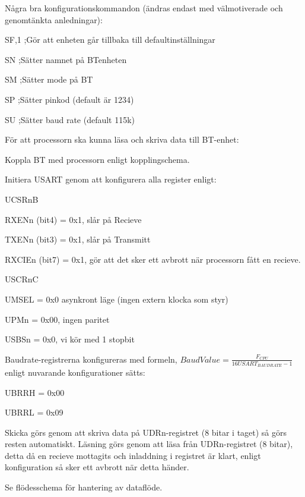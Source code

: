 Några bra konfigurationskommandon (ändras endast med välmotiverade och genomtänkta anledningar):

\begin{packed_itemize}
\item SF,1 ;Gör att enheten går tillbaka till defaultinställningar
\item SN  ;Sätter namnet på BTenheten
\item SM  ;Sätter mode på BT
\item SP  ;Sätter pinkod (default är 1234)
\item SU  ;Sätter baud rate (default 115k)
\end{packed_itemize}

För att processorn ska kunna läsa och skriva data till BT-enhet:

\begin{packed_enumerate}
	\item Koppla BT med processorn enligt kopplingschema.
	\item Initiera USART genom att konfigurera alla register enligt:
	\begin{packed_enumerate}
		\item UCSRnB
		\begin{packed_enumerate}
			\item RXENn (bit4) = 0x1, slår på Recieve
			\item TXENn (bit3) = 0x1, slår på Transmitt
			\item RXCIEn (bit7) = 0x1, gör att det sker ett avbrott när processorn fått en recieve.
		\end{packed_enumerate}
		\item USCRnC
		\begin{packed_enumerate}
			\item UMSEL = 0x0 asynkront läge (ingen extern klocka som styr)
			\item UPMn = 0x00, ingen paritet
			\item USBSn = 0x0, vi kör med 1 stopbit
		\end{packed_enumerate}
		\item Baudrate-registrerna konfigureras med formeln, $BaudValue = \frac{F_{CPU}}{16USART_{BAUDRATE} - 1}$ enligt nuvarande konfigurationer sätts:
		\begin{packed_enumerate}
			\item UBRRH = 0x00
			\item UBRRL = 0x09
		\end{packed_enumerate}
	\end{packed_enumerate}
	\item Skicka görs genom att skriva data på UDRn-registret (8 bitar i taget) så görs resten automatiskt. 
Läsning görs genom att läsa från UDRn-registret (8 bitar), detta då en recieve mottagits och inladdning i registret är klart, enligt konfiguration så sker ett avbrott när detta händer.
	\item Se flödesschema för hantering av dataflöde.
\end{packed_enumerate}


